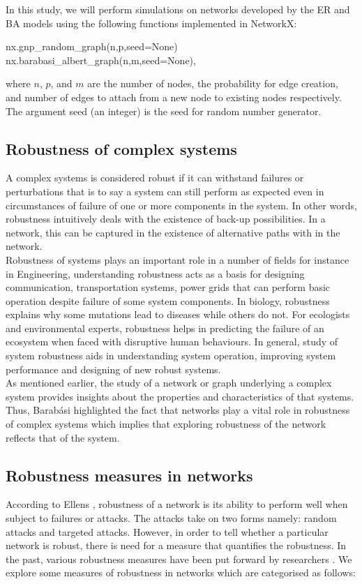 \documentclass[10pt,a4paper]{article}
\theoremstyle{plain}
\theoremstyle{definition}
\begin{document}
In this study, we will perform simulations on networks developed by the ER and BA models using the following functions implemented in NetworkX:
\begin{verbatim*}
nx.gnp_random_graph(n,p,seed=None)
nx.barabasi_albert_graph(n,m,seed=None),
\end{verbatim*} 

where $n$, $p$, and $m$ are the number of nodes, the probability for edge creation, and number of edges to attach from a new node to existing nodes respectively. The argument seed (an integer) is the seed for random number generator.

\subsection{Robustness of complex systems}
	A complex systems is considered robust if it can withstand failures or perturbations that is to say a system can still perform as expected even in circumstances of failure of one or more components in the system. 
	In other words, robustness intuitively deals with the existence of back-up possibilities. In a network, this can be captured in the existence of alternative paths with in the network.\\
	
	 Robustness of systems plays an important role in a number of fields for instance in Engineering, understanding robustness acts as a basis for designing communication, transportation systems, power grids that can perform basic operation despite failure of some system components. In biology, robustness explains why some mutations lead to diseases while others do not. For ecologists and environmental experts, robustness helps in predicting the failure of an ecosystem when faced with disruptive human behaviours. In general, study of system robustness aids in understanding system operation, improving system performance and designing of new robust systems. \\
	 
	As mentioned earlier, the study of a network or graph underlying a complex system provides insights about the properties and characteristics of that systems. Thus, Barab\'{a}si \citep{barabasi2016network} highlighted the fact that networks play a vital role in robustness of complex systems which implies that exploring robustness of the network reflects that of the system.
	 
	\subsection{Robustness measures in networks}
	According to Ellens \citep{ellens2013graph}, robustness of a network is its ability to perform well when subject to failures or attacks. The attacks take on two forms namely: random attacks and targeted attacks. However, in order to tell whether a particular network is robust, there is need for a measure that quantifies the robustness. In the past, various robustness measures have been put forward by researchers \citep{sydney2008elasticity}. We explore some measures of robustness in networks which are categorised as follows:
\end{document}
